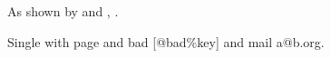 As shown by \cite{knuth84} and \cite{lamport94}, \cite[p. 33]{knuth84}.

Single with page \cite[pp. 10-12]{turing36} and bad [@bad\%key] and mail a@b.org.
